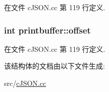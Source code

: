 在文件 c\+J\+S\+O\+N.\+cc 第 119 行定义.

\hypertarget{structprintbuffer_ac1e12f39d1f481112ccdb004235f7760}{}
\subsubsection[{offset}]{\setlength{\rightskip}{0pt plus 5cm}int printbuffer\+::offset}\label{structprintbuffer_ac1e12f39d1f481112ccdb004235f7760}


在文件 c\+J\+S\+O\+N.\+cc 第 119 行定义.



该结构体的文档由以下文件生成\+:\begin{DoxyCompactItemize}
\item 
src/\hyperlink{c_j_s_o_n_8cc}{c\+J\+S\+O\+N.\+cc}\end{DoxyCompactItemize}
